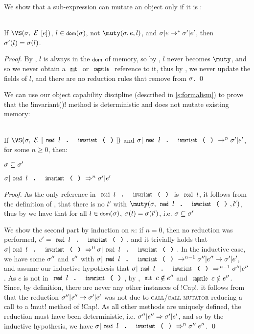 	\noindent We show that a sub-expression can mutate an object only if it is \muty:
	
	\SS\begin{Lemma}\ \\
		\indent If $\VS(\s,\E[e])$, $l \in \dom(\s)$, not $\muty(\s, e, l)$, and $\sigma|e \rightarrow^* \sigma'|e'$, then $\sigma'(l) = \sigma(l)$.
	\end{Lemma}
	\SS\begin{proof}
		By , $l$ is always in the $\dom$ of memory, so 
		by , $l$ never becomes $\muty$, and so we never obtain a $\Kw{mut}$ or $\Kw{capsule}$ reference to it, thus by , we never update the fields of $l$, and there are no reduction rules that remove from $\sigma$.
		\qed\end{proof}
	
	
	\LS
	
	\LS
		We can use our object capability discipline (described in \autoref{s:formalism}) to prove that the \Q!invariant()! method is deterministic and does not mutate existing memory:%
	
\SS\begin{Lemma}[Determinism]\ \\
	\indent If $\VS(\s, \E[\invariant{l}])$ and $\s|\invariant{l} \rightarrow^{n} \s'|e'$, for some $n \geq 0$, then:
	\begin{iitemize}
		\item $\sigma \subseteq \sigma'$\SS
		\item $\s|\invariant{l} \Rightarrow^{n} \s'|e'$
	\end{iitemize}
	\end{Lemma}\SS
	\begin{proof}
	As the only reference in $\invariant{l}$ is $\Kw{read}\,l$, it follows from the definition of \muty, that there is no $l'$ with $\muty(\s, \invariant{l}, l')$, thus by  we have that for all $l \in \dom(\s)$, $\sigma(l) = \sigma(l')$, i.e. $\sigma \subseteq \sigma'$

	We show the second part by induction on $n$: if $n = 0$, then no reduction was performed, $e' = \invariant{l}$, and it trivially holds that $\s|\invariant{l} \Rightarrow^{0} \s|\invariant{l}$. In the inductive case, we have some $\sigma''$ and ${\mathit{e}}''$ with $\s|\invariant{l} \rightarrow^{n - 1} \s''|e'' \rightarrow \s'|e'$, and assume our inductive hypothesis that $\s|\invariant{l} \Rightarrow^{n - 1} \s''|e''$.
	As $c$ is not \muty in $\invariant{l}$, by , $\Kw{mut}\,c \notin e''$ and $\Kw{capsule}\,c \notin e''$. Since, by definition, there are never any other instances of \Q!Cap!, it follows from  that the reduction $\sigma''|{\mathit{e}}'' \rightarrow \sigma'|e'$ was not due to \textsc{call/call mutator} reducing a call to a \Q!mut! method of \Q!Cap!.
	As all other methods are uniquely defined, the reduction must have been deterministic, i.e.  $\sigma''|{\mathit{e}}'' \Rightarrow \sigma'|e'$, and so by the inductive hypothesis, we have $\s|\invariant{l} \Rightarrow^{n} \s''|e''$.
	\qed\end{proof}

